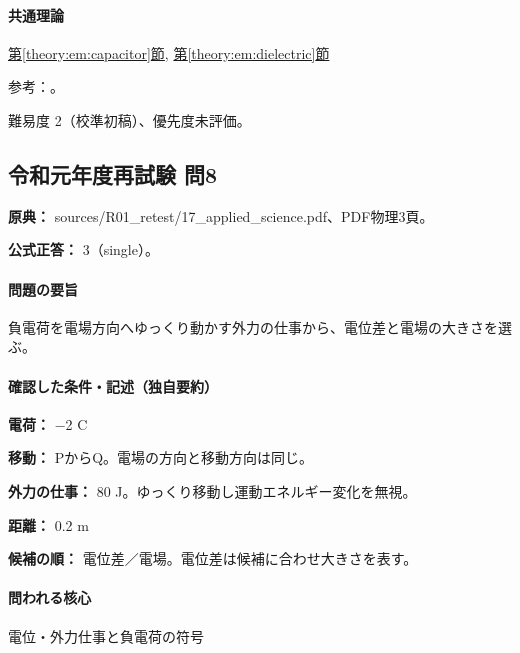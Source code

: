 \paragraph{共通理論} \hyperref[theory:em:capacitor]{第\ref*{theory:em:capacitor}節}, \hyperref[theory:em:dielectric]{第\ref*{theory:em:dielectric}節}

\par 参考：\cite{mit_em05}。

\par 難易度 2（校準初稿）、優先度未評価。

\subsection{令和元年度再試験 問8}
\label{q:r01-ret-applied-08}

\noindent\textbf{原典：} sources/R01\_retest/17\_applied\_science.pdf、PDF物理3頁。

\textbf{公式正答：} 3（single）。

\paragraph{問題の要旨} 負電荷を電場方向へゆっくり動かす外力の仕事から、電位差と電場の大きさを選ぶ。

\paragraph{確認した条件・記述（独自要約）}\mbox{}\par

\noindent\textbf{電荷：} −2 C\par

\noindent\textbf{移動：} PからQ。電場の方向と移動方向は同じ。\par

\noindent\textbf{外力の仕事：} 80 J。ゆっくり移動し運動エネルギー変化を無視。\par

\noindent\textbf{距離：} 0.2 m\par

\noindent\textbf{候補の順：} 電位差／電場。電位差は候補に合わせ大きさを表す。\par

\paragraph{問われる核心} 電位・外力仕事と負電荷の符号

